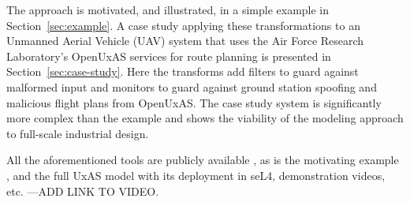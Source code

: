 The approach is motivated, and illustrated, in a simple example in Section~\ref{sec:example}. A case study applying these transformations to an Unmanned Aerial Vehicle (UAV) system that uses the Air Force Research Laboratory's OpenUxAS services for route planning is presented in Section~\ref{sec:case-study}. Here the transforms add filters to guard against malformed input and monitors to guard against ground station spoofing and malicious flight plans from OpenUxAS. The case study system is significantly more complex than the example and shows the viability of the modeling approach to full-scale industrial design. 

All the aforementioned tools are publicly available \cite{fmide}, as is the motivating example \cite{repo}, and the full UxAS model with its deployment in seL4, demonstration videos, etc. \cite{phase2, camkes} ---ADD LINK TO VIDEO.   

